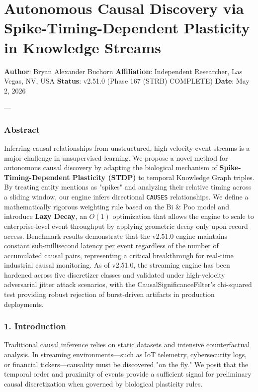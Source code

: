 \section{Autonomous Causal Discovery via Spike-Timing-Dependent Plasticity in Knowledge Streams}

\textbf{Author}: Bryan Alexander Buchorn  
\textbf{Affiliation}: Independent Researcher, Las Vegas, NV, USA  
\textbf{Status}: v2.51.0 (Phase 167 (STRB) COMPLETE)
\textbf{Date}: May 2, 2026

---

\subsubsection{Abstract}
Inferring causal relat\-ionships from unstr\-uctured, high-velocity event streams is a major challenge in unsup\-ervised learning. We propose a novel method for autonomous causal discovery by adapting the biological mechanism of \textbf{Spike-Timing-Dependent Plasticity (STDP)} to temporal Knowledge Graph triples. By treating entity mentions as "spikes" and analyzing their relative timing across a sliding window, our engine infers directional \texttt{CAUSES} relat\-ionships. We define a mathe\-matically rigorous weighting rule based on the Bi \& Poo \cite{bipoo1998} model and introduce \textbf{Lazy Decay}, an $O(1)$ optim\-ization that allows the engine to scale to enterprise-level event throughput by applying geometric decay only upon record access. Benchmark results demonstrate that the v2.51.0 engine maintains constant sub-millisecond latency per event regardless of the number of accumulated causal pairs, repre\-senting a critical break\-through for real-time industrial causal monitoring. As of v2.51.0, the streaming engine has been hardened across five discretizer classes and validated under high-velocity adversarial jitter attack scenarios, with the CausalSignif\-icanceFilter's chi-squared test providing robust rejection of burst-driven artifacts in production deployments.

\subsubsection{1. Introd\-uction}
Traditional causal inference relies on static datasets and intensive count\-erfactual analysis. In streaming envir\-onments—such as IoT telemetry, cyber\-security logs, or financial tickers—causality must be discovered "on the fly." We posit that the temporal order and proximity of events provide a sufficient signal for preliminary causal discr\-etization when governed by biological plasticity rules.

